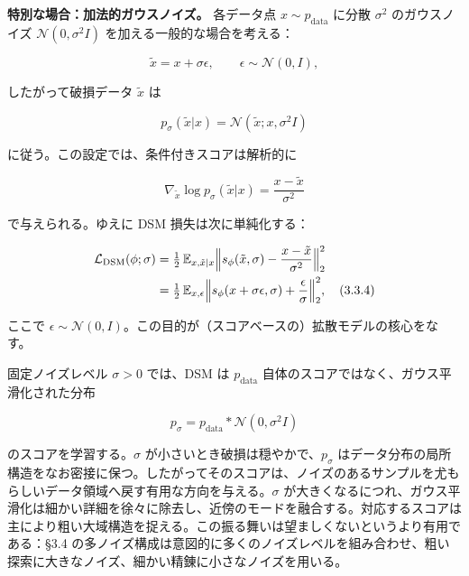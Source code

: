 \textbf{特別な場合：加法的ガウスノイズ。} 各データ点 $x\sim p_{\mathrm{data}}$ に分散 $\sigma^2$ のガウスノイズ $\mathcal{N}(0,\sigma^2 I)$ を加える一般的な場合を考える：

\[
\tilde{x}=x+\sigma\epsilon,\qquad\epsilon\sim\mathcal{N}(0,I),
\]


したがって破損データ $\tilde{x}$ は

\[
p_\sigma(\tilde{x}|x)=\mathcal{N}(\tilde{x};x,\sigma^2 I)
\]


に従う。この設定では、条件付きスコアは解析的に

\[
\nabla_{\tilde{x}}\log p_\sigma(\tilde{x}|x)=\frac{x-\tilde{x}}{\sigma^2}
\]


で与えられる。ゆえに DSM 損失は次に単純化する：



\begin{align*}
\begin{aligned}
\mathcal{L}_{\mathrm{DSM}}(\phi;\sigma)
&= \tfrac{1}{2}\,\mathbb{E}_{x,\tilde{x}|x}\Bigl\|s_\phi(\tilde{x},\sigma)-\frac{x-\tilde{x}}{\sigma^2}\Bigr\|_2^2 \\
&= \tfrac{1}{2}\,\mathbb{E}_{x,\epsilon}\Bigl\|s_\phi(x+\sigma\epsilon,\sigma)+\frac{\epsilon}{\sigma}\Bigr\|_2^2,
\quad (3.3.4)
\end{aligned}
\end{align*}


ここで $\epsilon\sim\mathcal{N}(0,I)$。この目的が（スコアベースの）拡散モデルの核心をなす。

固定ノイズレベル $\sigma>0$ では、DSM は $p_{\mathrm{data}}$ 自体のスコアではなく、ガウス平滑化された分布

\[
p_\sigma = p_{\mathrm{data}} * \mathcal{N}(0,\sigma^2 I)
\]


のスコアを学習する。$\sigma$ が小さいとき破損は穏やかで、$p_\sigma$ はデータ分布の局所構造をなお密接に保つ。したがってそのスコアは、ノイズのあるサンプルを尤もらしいデータ領域へ戻す有用な方向を与える。$\sigma$ が大きくなるにつれ、ガウス平滑化は細かい詳細を徐々に除去し、近傍のモードを融合する。対応するスコアは主により粗い大域構造を捉える。この振る舞いは望ましくないというより有用である：§3.4 の多ノイズ構成は意図的に多くのノイズレベルを組み合わせ、粗い探索に大きなノイズ、細かい精錬に小さなノイズを用いる。

